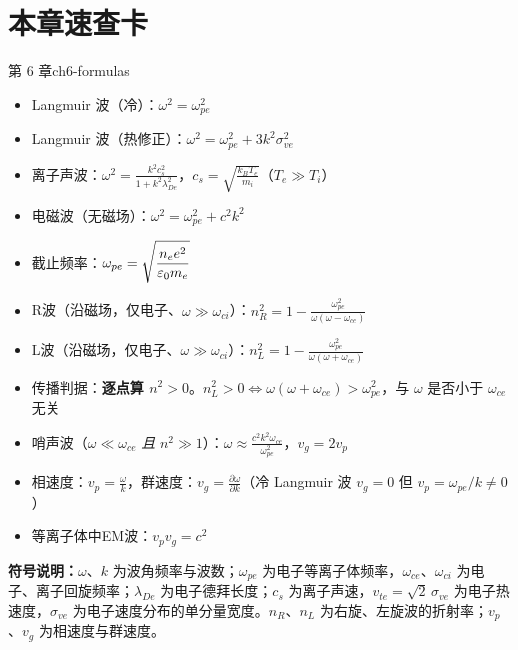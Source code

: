 \section*{本章速查卡}
{}
\begin{formulabox}{第 6 章}{ch6-formulas}
\begin{itemize}[leftmargin=*,itemsep=0pt]
\item Langmuir 波（冷）：$\displaystyle\omega^2 = \omega_{pe}^2$
\item Langmuir 波（热修正）：$\displaystyle\omega^2 = \omega_{pe}^2 + 3k^2\sigma_{ve}^2$
\item 离子声波：$\displaystyle\omega^2 = \frac{k^2c_s^2}{1+k^2\lambda_{De}^2}$，$\displaystyle c_s = \sqrt{\frac{k_{\!B}T_e}{m_i}}$（$T_e\gg T_i$）
\item 电磁波（无磁场）：$\displaystyle\omega^2 = \omega_{pe}^2 + c^2k^2$
\item 截止频率：$\displaystyle\omega_{pe} = \sqrt{\frac{n_e e^2}{\varepsilon_0 m_e}}$
\item R波（沿磁场，仅电子、$\omega\gg\omega_{ci}$）：$\displaystyle n_R^2 = 1 - \frac{\omega_{pe}^2}{\omega(\omega-\omega_{ce})}$
\item L波（沿磁场，仅电子、$\omega\gg\omega_{ci}$）：$\displaystyle n_L^2 = 1 - \frac{\omega_{pe}^2}{\omega(\omega+\omega_{ce})}$
\item 传播判据：\textbf{逐点算 $n^2>0$}。$n_L^2>0\iff\omega(\omega+\omega_{ce})>\omega_{pe}^2$，与 $\omega$ 是否小于 $\omega_{ce}$ 无关
\item 哨声波（$\omega\ll\omega_{ce}$ \emph{且} $n^2\gg1$）：$\displaystyle\omega \approx \frac{c^2k^2\omega_{ce}}{\omega_{pe}^2}$，$v_g = 2v_p$
\item 相速度：$\displaystyle v_p = \frac{\omega}{k}$，群速度：$\displaystyle v_g = \frac{\partial\omega}{\partial k}$（冷 Langmuir 波 $v_g=0$ 但 $v_p=\omega_{pe}/k\neq0$）
\item 等离子体中EM波：$\displaystyle v_p v_g = c^2$
\end{itemize}
\textbf{符号说明：}$\omega$、$k$ 为波角频率与波数；$\omega_{pe}$ 为电子等离子体频率，$\omega_{ce}$、$\omega_{ci}$ 为电子、离子回旋频率；$\lambda_{De}$ 为电子德拜长度；$c_s$ 为离子声速，$v_{te}=\sqrt2\,\sigma_{ve}$ 为电子热速度，$\sigma_{ve}$ 为电子速度分布的单分量宽度。$n_R$、$n_L$ 为右旋、左旋波的折射率；$v_p$、$v_g$ 为相速度与群速度。
\end{formulabox}

